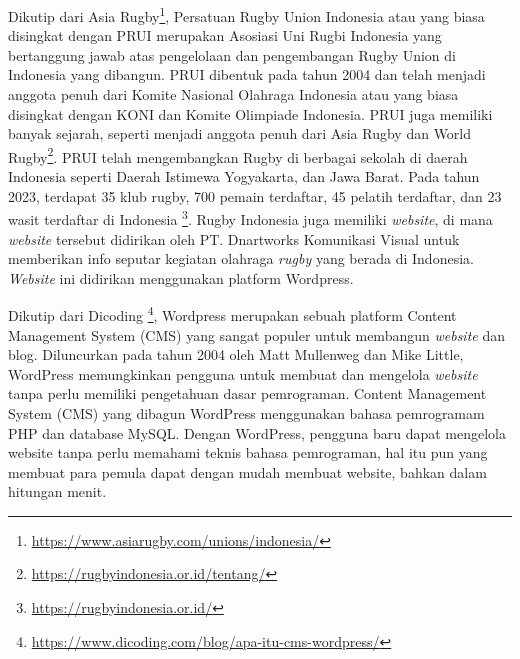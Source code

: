 Dikutip dari Asia Rugby\footnote{\url{https://www.asiarugby.com/unions/indonesia/}}, Persatuan Rugby Union Indonesia atau yang biasa disingkat dengan PRUI merupakan Asosiasi Uni Rugbi Indonesia yang bertanggung jawab atas pengelolaan dan pengembangan Rugby Union di Indonesia yang dibangun. PRUI dibentuk pada tahun 2004 dan telah menjadi anggota penuh dari Komite Nasional Olahraga Indonesia atau yang biasa disingkat dengan KONI dan Komite Olimpiade Indonesia. PRUI juga memiliki banyak sejarah, seperti menjadi anggota penuh dari Asia Rugby dan World Rugby\footnote{\url{https://rugbyindonesia.or.id/tentang/}}. PRUI telah mengembangkan Rugby di berbagai sekolah di daerah Indonesia seperti Daerah Istimewa Yogyakarta, dan Jawa Barat. Pada tahun 2023, terdapat 35 klub rugby, 700 pemain terdaftar, 45 pelatih terdaftar, dan 23 wasit terdaftar di Indonesia \footnote{\url{https://rugbyindonesia.or.id/}}. Rugby Indonesia juga memiliki \textit{website}, di mana \textit{website} tersebut didirikan oleh PT. Dnartworks Komunikasi Visual untuk memberikan info seputar kegiatan olahraga \textit{rugby} yang berada di Indonesia. \textit{Website} ini didirikan menggunakan platform Wordpress.

Dikutip dari Dicoding \footnote{\url{https://www.dicoding.com/blog/apa-itu-cms-wordpress/}}, Wordpress merupakan sebuah platform Content Management System (CMS) yang sangat populer untuk membangun \textit{website} dan blog. Diluncurkan pada tahun 2004 oleh Matt Mullenweg dan Mike Little, WordPress memungkinkan pengguna untuk membuat dan mengelola \textit{website} tanpa perlu memiliki pengetahuan dasar pemrograman. Content Management System (CMS) yang dibagun WordPress menggunakan bahasa pemrogramam PHP dan database MySQL. Dengan WordPress, pengguna baru dapat mengelola website tanpa perlu memahami teknis bahasa pemrograman, hal itu pun yang membuat para pemula dapat dengan mudah membuat website, bahkan dalam hitungan menit.

